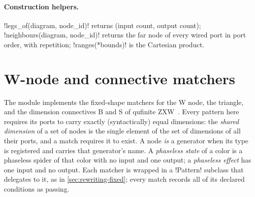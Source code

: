 \paragraph{Construction helpers.}
\py!legs_of(diagram, node_id)! returns (input count, output count); \py!neighbours(diagram, node_id)!
returns the far node of every wired port in port order, with repetition;
\py!ranges(*bounds)! is the Cartesian product.

\section{W-node and connective matchers}\label{sec:rewriting-zxw}

The module  implements the fixed-shape matchers for the W
node, the triangle, and the dimension connectives B and S of qufinite
ZXW~\cite{wang2023qufinitezxw}. Every pattern here requires its ports to carry exactly (syntactically)
equal dimensions: the \emph{shared dimension} of a set of nodes is the single element of the set
of dimensions of all their ports, and a match requires it to exist. A node \emph{is} a generator
when its type is registered and carries that generator's name. A \emph{phaseless state} of a color
is a phaseless spider of that color with no input and one output; a \emph{phaseless effect} has one
input and no output. Each matcher is wrapped in a \py!Pattern! subclass that delegates to it, as in
\cref{sec:rewriting-fixed}; every match records all of its declared conditions as passing.


